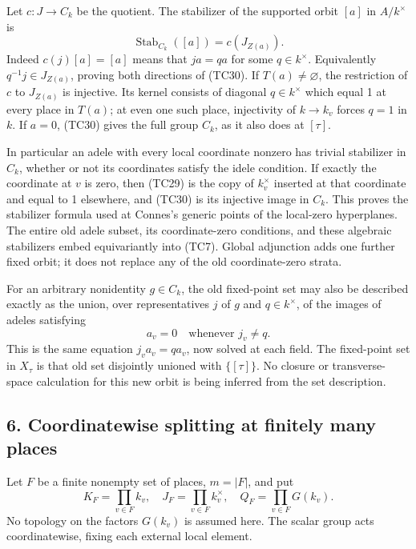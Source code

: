 \documentclass[
  10pt,
]{article}
\begin{document}
Let \(c:J\to C_k\) be the quotient. The stabilizer of the supported
orbit \([a]\) in \(A/k^\times\) is \[
\operatorname{Stab}_{C_k}([a])=c(J_{Z(a)}).
\tag{TC30}
\] Indeed \(c(j)[a]=[a]\) means that \(ja=qa\) for some
\(q\in k^\times\). Equivalently \(q^{-1}j\in J_{Z(a)}\), proving both
directions of (TC30). If \(T(a)\ne\varnothing\), the restriction of
\(c\) to \(J_{Z(a)}\) is injective. Its kernel consists of diagonal
\(q\in k^\times\) which equal 1 at every place in \(T(a)\); at even one
such place, injectivity of \(k\to k_v\) forces \(q=1\) in \(k\). If
\(a=0\), (TC30) gives the full group \(C_k\), as it also does at
\([\tau]\).

In particular an adele with every local coordinate nonzero has trivial
stabilizer in \(C_k\), whether or not its coordinates satisfy the idele
condition. If exactly the coordinate at \(v\) is zero, then (TC29) is
the copy of \(k_v^\times\) inserted at that coordinate and equal to 1
elsewhere, and (TC30) is its injective image in \(C_k\). This proves the
stabilizer formula used at Connes's generic points of the local-zero
hyperplanes. The entire old adele subset, its coordinate-zero
conditions, and these algebraic stabilizers embed equivariantly into
(TC7). Global adjunction adds one further fixed orbit; it does not
replace any of the old coordinate-zero strata.

For an arbitrary nonidentity \(g\in C_k\), the old fixed-point set may
also be described exactly as the union, over representatives \(j\) of
\(g\) and \(q\in k^\times\), of the images of adeles satisfying \[
a_v=0\quad\text{whenever }j_v\ne q.
\tag{TC31}
\] This is the same equation \(j_va_v=qa_v\), now solved at each field.
The fixed-point set in \(X_\tau\) is that old set disjointly unioned
with \(\{[\tau]\}\). No closure or transverse-space calculation for this
new orbit is being inferred from the set description.

\subsection{6. Coordinatewise splitting at finitely many
places}\label{coordinatewise-splitting-at-finitely-many-places}

Let \(F\) be a finite nonempty set of places, \(m=|F|\), and put \[
K_F=\prod_{v\in F}k_v,\quad J_F=\prod_{v\in F}k_v^\times,
\quad Q_F=\prod_{v\in F}G(k_v).
\tag{TC32}
\] No topology on the factors \(G(k_v)\) is assumed here. The scalar
group acts coordinatewise, fixing each external local element.
\end{document}
